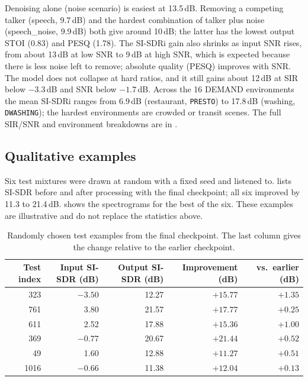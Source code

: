 \documentclass[11pt,a4paper]{article}
\newcommand{\sisdr}{SI-SDR}
\newcommand{\sisdri}{SI-SDRi}
\begin{document}
Denoising alone (noise scenario) is easiest at 13.5\,dB. Removing a competing talker (speech,
9.7\,dB) and the hardest combination of talker plus noise (speech\_noise, 9.9\,dB) both give
around 10\,dB; the latter has the lowest output STOI (0.83) and PESQ (1.78). The \sisdri{} gain
also shrinks as input SNR rises, from about 13\,dB at low SNR to 9\,dB at high SNR, which is
expected because there is less noise left to remove; absolute quality (PESQ) improves with SNR.
The model does not collapse at hard ratios, and it still gains about 12\,dB at SIR below
$-3.3$\,dB and SNR below $-1.7$\,dB. Across the 16 DEMAND environments the mean \sisdri{} ranges
from 6.9\,dB (restaurant, \texttt{PRESTO}) to 17.8\,dB (washing, \texttt{DWASHING}); the hardest
environments are crowded or transit scenes. The full SIR/SNR and environment breakdowns are in
.

\subsection{Qualitative examples}
Six test mixtures were drawn at random with a fixed seed and listened to. 
lists \sisdr{} before and after processing with the final checkpoint; all six improved by 11.3 to
21.4\,dB.  shows the spectrograms for the best of the six. These examples are
illustrative and do not replace the statistics above.

\begin{table}[htbp]
\centering\small
\caption{Randomly chosen test examples from the final checkpoint. The last column gives the change
relative to the earlier checkpoint.}
\label{tab:examples}
\begin{tabular}{@{}rrrrr@{}}
\toprule
Test index & Input \sisdr{} (dB) & Output \sisdr{} (dB) & Improvement (dB) & vs.\ earlier (dB)\\
\midrule
323 & $-3.50$ & 12.27 & $+15.77$ & $+1.35$\\
761 & 3.80 & 21.57 & $+17.77$ & $+0.25$\\
611 & 2.52 & 17.88 & $+15.36$ & $+1.00$\\
369 & $-0.77$ & 20.67 & $+21.44$ & $+0.52$\\
49 & 1.60 & 12.88 & $+11.27$ & $+0.51$\\
1016 & $-0.66$ & 11.38 & $+12.04$ & $+0.13$\\
\bottomrule
\end{tabular}
\end{table}
\end{document}
